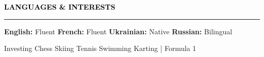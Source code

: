 \documentclass[10pt,english,french]{article}
\newcommand{\chessIcon}[1][black]{\textcolor{#1}{\faChess}}
\newcommand{\skiIcon}[1][black]{\textcolor{#1}{\faSkiing}}
\newcommand{\cryptoIcon}[1][black]{\textcolor{#1}{\faBitcoin}}
\newcommand{\swimmingIcon}[1][black]{\textcolor{#1}{\faSwimmer}}
\newcommand{\mountainsIcon}[1][black]{\textcolor{#1}{\faMountain}}
\newcommand{\speechBubbleIcon}[1][black]{\textcolor{#1}{\faComment}}
\newcommand{\tradingIcon}[1][black]{\textcolor{#1}{\faChartBar}}
\newcommand{\tennisIcon}[1][black]{\textcolor{#1}{\faBaseballBall}}
\newcommand{\flagIcon}[1][black]{\textcolor{#1}{\faFlagCheckered}}
\newlength{\mpwidth}
\newcommand{\cvsection}[1]{
    \vspace{4pt}
    \textbf{\fontsize{9pt}{10pt}\selectfont \textcolor{black}{#1}}
    \vspace{6pt}
    \hrule
    \vspace{6pt}
}
\newcommand{\cvtextnotab}[1]{
    \parbox{1\mpwidth}{#1}
}
\begin{document}
\vspace{-5pt}
\cvsection{\speechBubbleIcon[black]\hspace{4pt}LANGUAGES \& INTERESTS}

\vspace{-3pt}
\cvtextnotab{\textbf{English\!:} Fluent \hspace{12pt} \textbf{French\!:} Fluent \hspace{12pt} \textbf{Ukrainian\!:} Native \hspace{20pt} \textbf{Russian\!:} Bilingual}

\vspace{-8pt}
\cvtextnotab{
    \tradingIcon[black]\hspace{2pt}Investing \hspace{12pt}
    \chessIcon[black]\hspace{2pt}Chess \hspace{12pt}
    \skiIcon[black]\hspace{2pt}Skiing \hspace{12pt}
    \tennisIcon[black]\hspace{2pt}Tennis \hspace{12pt}
    \swimmingIcon[black]\hspace{2pt}Swimming \hspace{12pt}
    \flagIcon[black]\hspace{2pt}Karting | Formula 1
}
\end{document}
